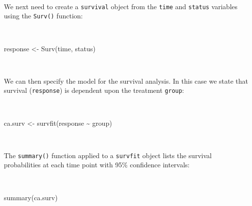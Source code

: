 \documentclass[
  12pt,
  a4paper]{book}
\newenvironment{Shaded}{\begin{snugshade}}{\end{snugshade}}
\newcommand{\FunctionTok}[1]{\textcolor[rgb]{0.00,0.00,0.00}{#1}}
\newcommand{\NormalTok}[1]{#1}
\newcommand{\OtherTok}[1]{\textcolor[rgb]{0.56,0.35,0.01}{#1}}
\newcommand{\SpecialCharTok}[1]{\textcolor[rgb]{0.00,0.00,0.00}{#1}}
\begin{document}
~

We next need to create a \texttt{survival} object from the \texttt{time} and \texttt{status} variables using the \texttt{Surv()} function:

~

\begin{Shaded}
\begin{Highlighting}[]
\NormalTok{response }\OtherTok{\textless{}{-}} \FunctionTok{Surv}\NormalTok{(time, status)}
\end{Highlighting}
\end{Shaded}

~

We can then specify the model for the survival analysis. In this case we state that survival (\texttt{response}) is dependent upon the treatment \texttt{group}:

~

\begin{Shaded}
\begin{Highlighting}[]
\NormalTok{ca.surv }\OtherTok{\textless{}{-}} \FunctionTok{survfit}\NormalTok{(response }\SpecialCharTok{\textasciitilde{}}\NormalTok{ group)}
\end{Highlighting}
\end{Shaded}

~

The \texttt{summary()} function applied to a \texttt{survfit} object lists the survival probabilities at each time point with 95\% confidence intervals:

~

\begin{Shaded}
\begin{Highlighting}[]
\FunctionTok{summary}\NormalTok{(ca.surv)}
\end{Highlighting}
\end{Shaded}
\end{document}
